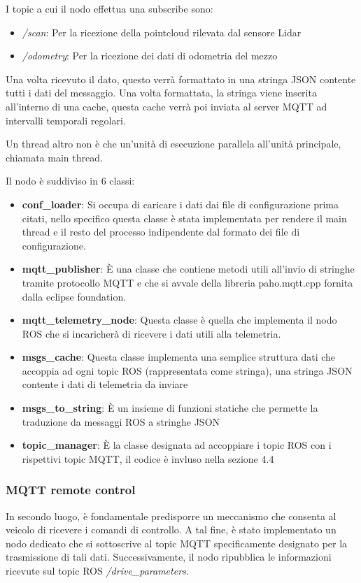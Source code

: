 \noindent I topic a cui il nodo effettua una subscribe sono:

\begin{itemize}
  \item \textit{/scan}: Per la ricezione della pointcloud rilevata dal sensore Lidar
  \item \textit{/odometry}: Per la ricezione dei dati di odometria del mezzo
\end{itemize}

\noindent Una volta ricevuto il dato, questo verrà formattato in una stringa JSON contente tutti i dati del messaggio. Una volta formattata, la stringa viene inserita all'interno di una cache, questa cache verrà poi inviata al server MQTT ad intervalli temporali regolari.

\noindent Un thread altro non è che un'unità di esecuzione parallela all'unità principale, chiamata main thread.

\noindent Il nodo è suddiviso in 6 classi:

\begin{itemize}
  \item \textbf{conf\_loader}: Si occupa di caricare i dati dai file di configurazione prima citati, nello specifico questa classe è stata implementata per rendere il main thread e il resto del processo indipendente dal formato dei file di configurazione.
  \item \textbf{mqtt\_publisher}: È una classe che contiene metodi utili all'invio di stringhe tramite protocollo MQTT e che si avvale della libreria paho.mqtt.cpp fornita dalla eclipse foundation. 
  \item \textbf{mqtt\_telemetry\_node}: Questa classe è quella che implementa il nodo ROS che si incaricherà di ricevere i dati utili alla telemetria.
  \item \textbf{msgs\_cache}: Questa classe implementa una semplice struttura dati che accoppia ad ogni topic ROS (rappresentata come stringa), una stringa JSON contente i dati di telemetria da inviare
  \item \textbf{msgs\_to\_string}: È un insieme di funzioni statiche che permette la traduzione da messaggi ROS a stringhe JSON
  \item \textbf{topic\_manager}: È la classe designata ad accoppiare i topic ROS con i rispettivi topic MQTT, il codice è invluso nella sezione 4.4 
\end{itemize}

\subsubsection{MQTT remote control}
In secondo luogo, è fondamentale predisporre un meccanismo che consenta al veicolo di ricevere i comandi di controllo. A tal fine, è stato implementato un nodo dedicato che si sottoscrive al topic MQTT specificamente designato per la trasmissione di tali dati. Successivamente, il nodo ripubblica le informazioni ricevute sul topic ROS \textit{/drive\_parameters}.

